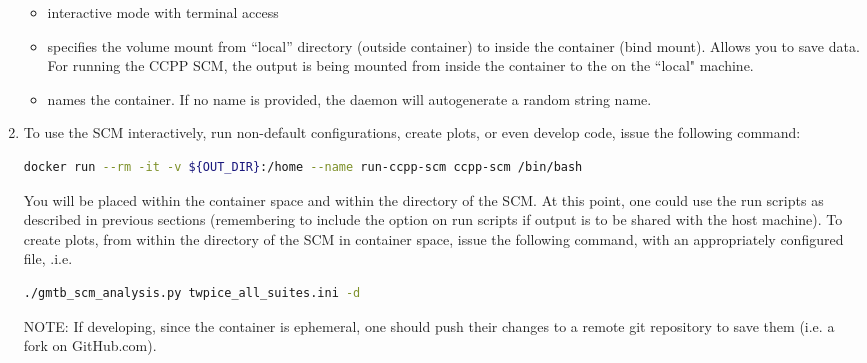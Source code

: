 \begin{enumerate}
\begin{itemize}
\item {} interactive mode with terminal access
\item {} specifies the volume mount from ``local'' directory (outside container) to inside the container (bind mount). Allows you to save data. For running the CCPP SCM, the output is being mounted from  inside the container to the  on the ``local" machine.
\item {} names the container. If no name is provided, the daemon will autogenerate a random string name.
\end{itemize}
\item To use the SCM interactively, run non-default configurations, create plots, or even develop code, issue the following command:
\begin{lstlisting}[language=bash]
docker run --rm -it -v ${OUT_DIR}:/home --name run-ccpp-scm ccpp-scm /bin/bash
\end{lstlisting}
You will be placed within the container space and within the  directory of the SCM. At this point, one could use the run scripts as described in previous sections (remembering to include the  option on run scripts if output is to be shared with the host machine). To create plots, from within the  directory of the SCM in container space, issue the following command, with an appropriately configured  file, .i.e.
\begin{lstlisting}[language=bash]
./gmtb_scm_analysis.py twpice_all_suites.ini -d
\end{lstlisting}
NOTE: If developing, since the container is ephemeral, one should push their changes to a remote git repository to save them (i.e. a fork on GitHub.com).
\end{enumerate}



